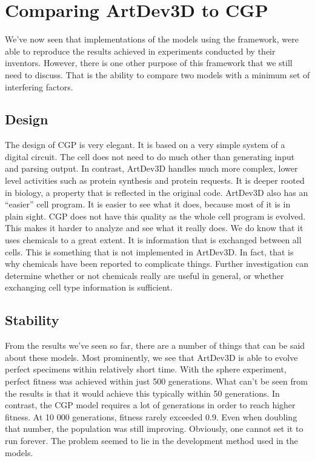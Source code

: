 \section{Comparing ArtDev3D to CGP}
We've now seen that implementations of the models using the framework, were able to reproduce the results achieved in experiments conducted by their inventors. However, there is one other purpose of this framework that we still need to discuss. That is the ability to compare two models with a minimum set of interfering factors.


\subsection{Design}
The design of CGP is very elegant. It is based on a very simple system of a digital circuit. The cell does not need to do much other than generating input and parsing output. In contrast, ArtDev3D handles much more complex, lower level activities such as protein synthesis and protein requests. It is deeper rooted in biology, a property that is reflected in the original code. ArtDev3D also has an ``easier'' cell program. It is easier to see what it does, because most of it is in plain sight. CGP does not have this quality as the whole cell program is evolved. This makes it harder to analyze and see what it really does. We do know that it uses chemicals to a great extent. It is information that is exchanged between all cells. This is something that is not implemented in ArtDev3D. In fact, that is why chemicals have been reported\cite{hoye2006} to complicate things. Further investigation can determine whether or not chemicals really are useful in general, or whether exchanging cell type information is sufficient.


\subsection{Stability}
From the results we've seen so far, there are a number of things that can be said about these models. Most prominently, we see that ArtDev3D is able to evolve perfect specimens within relatively short time. With the sphere experiment, perfect fitness was achieved within just 500 generations. What can't be seen from the results is that it would achieve this typically within 50 generations. In contrast, the CGP model requires a lot of generations in order to reach higher fitness. At 10 000 generations, fitness rarely exceeded 0.9. Even when doubling that number, the population was still improving. Obviously, one cannot set it to run forever. The problem seemed to lie in the development method used in the models.

